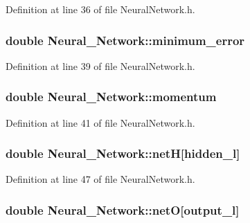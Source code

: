 Definition at line 36 of file Neural\-Network.\-h.

\hypertarget{a00003_aa2898d2ec7ac091b6d40916d4b113a93}{
\subsubsection[{minimum\-\_\-error}]{\setlength{\rightskip}{0pt plus 5cm}double Neural\-\_\-\-Network\-::minimum\-\_\-error\hspace{0.3cm}{\ttfamily [private]}}}\label{d1/d7c/a00003_aa2898d2ec7ac091b6d40916d4b113a93}


Definition at line 39 of file Neural\-Network.\-h.

\hypertarget{a00003_a3a3ea713384da26e538bc60da8410a75}{
\subsubsection[{momentum}]{\setlength{\rightskip}{0pt plus 5cm}double Neural\-\_\-\-Network\-::momentum\hspace{0.3cm}{\ttfamily [private]}}}\label{d1/d7c/a00003_a3a3ea713384da26e538bc60da8410a75}


Definition at line 41 of file Neural\-Network.\-h.

\hypertarget{a00003_aa07e5b1f8997f895d7550495a5b4f0d2}{
\subsubsection[{net\-H}]{\setlength{\rightskip}{0pt plus 5cm}double Neural\-\_\-\-Network\-::net\-H\mbox{[}{\bf hidden\-\_\-l}\mbox{]}\hspace{0.3cm}{\ttfamily [private]}}}\label{d1/d7c/a00003_aa07e5b1f8997f895d7550495a5b4f0d2}


Definition at line 47 of file Neural\-Network.\-h.

\hypertarget{a00003_a8bcf19afde3c08afbd862759c839a769}{
\subsubsection[{net\-O}]{\setlength{\rightskip}{0pt plus 5cm}double Neural\-\_\-\-Network\-::net\-O\mbox{[}{\bf output\-\_\-l}\mbox{]}\hspace{0.3cm}{\ttfamily [private]}}}\label{d1/d7c/a00003_a8bcf19afde3c08afbd862759c839a769}



